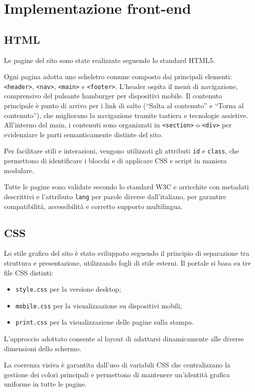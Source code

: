 \documentclass[10pt, letterpaper]{article}
\begin{document}
\section{Implementazione front-end}
\subsection{HTML}
Le pagine del sito sono state realizzate seguendo lo standard HTML5.

Ogni pagina adotta uno scheletro comune composto dai principali elementi: \texttt{<header>}, \texttt{<nav>}, \texttt{<main>} e \texttt{<footer>}. L’header ospita il menù di navigazione, comprensivo del pulsante hamburger per dispositivi mobile.
Il contenuto principale è punto di arrivo per i link di salto (“Salta al contenuto” e “Torna al contenuto”), che migliorano la navigazione tramite tastiera e tecnologie assistive. All’interno del main, i contenuti sono organizzati in \texttt{<section>} o \texttt{<div>} per evidenziare le parti semanticamente distinte del sito.

Per facilitare stili e interazioni, vengono utilizzati gli attributi \texttt{id} e \texttt{class}, che permettono di identificare i blocchi e di applicare CSS e script in maniera modulare.

Tutte le pagine sono validate secondo lo standard W3C e arricchite con metadati descrittivi e l’attributo \texttt{lang} per parole diverse dall'italiano, per garantire compatibilità, accessibilità e corretto supporto multilingua.

\subsection{CSS}
Lo stile grafico del sito è stato sviluppato seguendo il principio di separazione tra struttura e presentazione, utilizzando fogli di stile esterni. Il portale si basa su tre file CSS distinti:
\begin{itemize}
    \item \texttt{style.css} per la versione desktop;
    \item \texttt{mobile.css} per la visualizzazione su dispositivi mobili;
    \item \texttt{print.css} per la visualizzazione delle pagine sulla stampa.
\end{itemize}

L’approccio adottato consente al layout di adattarsi dinamicamente alle diverse dimensioni dello schermo. 

La coerenza visiva è garantita dall’uso di variabili CSS che centralizzano la gestione dei colori principali e permettono di mantenere un’identità grafica uniforme in tutte le pagine. 
\end{document}
